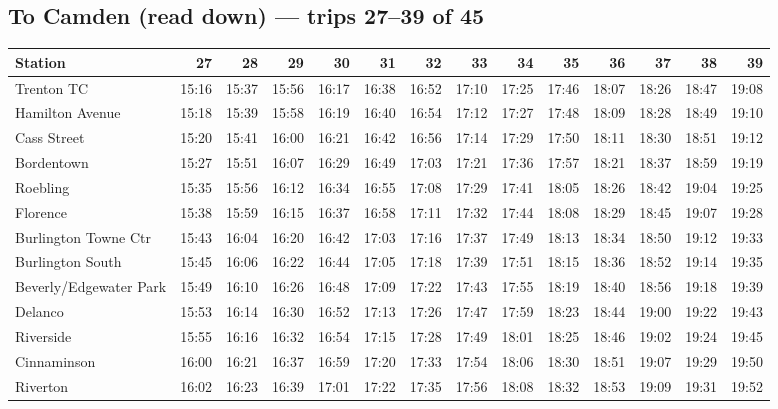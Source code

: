 \subsection*{To Camden (read down) --- trips 27--39 of 45}
\begin{center}\footnotesize\setlength{\tabcolsep}{3pt}\begin{tabular}{@{}lrrrrrrrrrrrrr@{}}\toprule
Station & 27 & 28 & 29 & 30 & 31 & 32 & 33 & 34 & 35 & 36 & 37 & 38 & 39 \\\midrule
Trenton TC & 15:16 & 15:37 & 15:56 & 16:17 & 16:38 & 16:52 & 17:10 & 17:25 & 17:46 & 18:07 & 18:26 & 18:47 & 19:08 \\
Hamilton Avenue & 15:18 & 15:39 & 15:58 & 16:19 & 16:40 & 16:54 & 17:12 & 17:27 & 17:48 & 18:09 & 18:28 & 18:49 & 19:10 \\
Cass Street & 15:20 & 15:41 & 16:00 & 16:21 & 16:42 & 16:56 & 17:14 & 17:29 & 17:50 & 18:11 & 18:30 & 18:51 & 19:12 \\
Bordentown & 15:27 & 15:51 & 16:07 & 16:29 & 16:49 & 17:03 & 17:21 & 17:36 & 17:57 & 18:21 & 18:37 & 18:59 & 19:19 \\
Roebling & 15:35 & 15:56 & 16:12 & 16:34 & 16:55 & 17:08 & 17:29 & 17:41 & 18:05 & 18:26 & 18:42 & 19:04 & 19:25 \\
Florence & 15:38 & 15:59 & 16:15 & 16:37 & 16:58 & 17:11 & 17:32 & 17:44 & 18:08 & 18:29 & 18:45 & 19:07 & 19:28 \\
Burlington Towne Ctr & 15:43 & 16:04 & 16:20 & 16:42 & 17:03 & 17:16 & 17:37 & 17:49 & 18:13 & 18:34 & 18:50 & 19:12 & 19:33 \\
Burlington South & 15:45 & 16:06 & 16:22 & 16:44 & 17:05 & 17:18 & 17:39 & 17:51 & 18:15 & 18:36 & 18:52 & 19:14 & 19:35 \\
Beverly/Edgewater Park & 15:49 & 16:10 & 16:26 & 16:48 & 17:09 & 17:22 & 17:43 & 17:55 & 18:19 & 18:40 & 18:56 & 19:18 & 19:39 \\
Delanco & 15:53 & 16:14 & 16:30 & 16:52 & 17:13 & 17:26 & 17:47 & 17:59 & 18:23 & 18:44 & 19:00 & 19:22 & 19:43 \\
Riverside & 15:55 & 16:16 & 16:32 & 16:54 & 17:15 & 17:28 & 17:49 & 18:01 & 18:25 & 18:46 & 19:02 & 19:24 & 19:45 \\
Cinnaminson & 16:00 & 16:21 & 16:37 & 16:59 & 17:20 & 17:33 & 17:54 & 18:06 & 18:30 & 18:51 & 19:07 & 19:29 & 19:50 \\
Riverton & 16:02 & 16:23 & 16:39 & 17:01 & 17:22 & 17:35 & 17:56 & 18:08 & 18:32 & 18:53 & 19:09 & 19:31 & 19:52 \\

\end{tabular}
\end{center}

